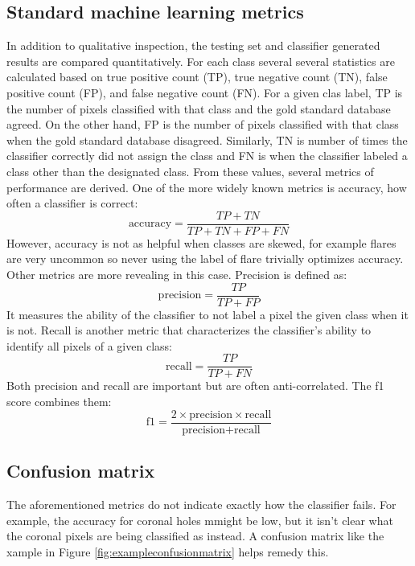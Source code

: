 \documentclass[twoside]{report}
\begin{document}
\subsection{Standard machine learning metrics}
In addition to qualitative inspection, the testing set and classifier generated results are compared quantitatively. For each class several several statistics are calculated based on true positive count (TP), true negative count (TN), false positive count (FP), and false negative count (FN). For a given clas label, TP is the number of pixels classified with that class and the gold standard database agreed. On the other hand, FP is the number of pixels classified with that class when the gold standard database disagreed. Similarly, TN is number of times the classifier correctly did not assign the class and FN is when the classifier labeled a class other than the designated class. From these values, several metrics of performance are derived. One of the more widely known metrics is accuracy, how often a classifier is correct:
\[\text{accuracy} = \frac{TP + TN}{TP + TN + FP + FN}\] However, accuracy is not as helpful when classes are skewed, for example flares are very uncommon so never using the label of flare trivially optimizes accuracy. Other metrics are more revealing in this case. Precision is defined as:
\[ \text{precision} = \frac{TP}{TP + FP} \]
It measures the ability of the classifier to not label a pixel the given class when it is not. Recall is another metric that characterizes the classifier's ability to identify all pixels of a given class:
\[\text{recall} = \frac{TP}{TP + FN}\]
Both precision and recall are important but are often anti-correlated. The f1 score combines them:
\[\text{f1} = \frac{2 \times \text{precision} \times \text{recall}}{\text{precision} + \text{recall}}\]


\subsection{Confusion matrix}
The aforementioned metrics do not indicate exactly how the classifier fails. For example, the accuracy for coronal holes mmight be low, but it isn't clear what the coronal pixels are being classified as instead. A confusion matrix like the xample in Figure \ref{fig:exampleconfusionmatrix} helps remedy this.
\end{document}
